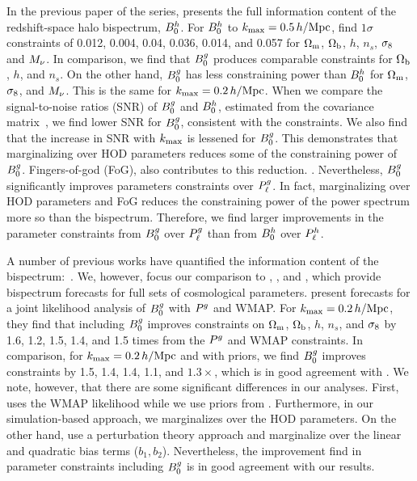 In the previous paper of the series, \cite{hahn2020} presents the full
information content of the redshift-space halo bispectrum, $B^h_0$. For $B^h_0$ to
$k_{\rm max}=0.5\,h/\mathrm{Mpc}$, \cite{hahn2020} find $1\sigma$ constraints of 0.012, 0.004,
0.04, 0.036, 0.014, and 0.057 for $\Omega_{\rm m}$, $\Omega_{\rm b}$, $h$, $n_s$, $\sigma_8$ and $M_\nu$. 
In comparison, we find that $B^g_0$ produces comparable constraints for $\Omega_{\rm b}$, 
$h$, and $n_s$. On the other hand, $B^g_0$ has less constraining power than 
$B^h_0$ for $\Omega_{\rm m}$, $\sigma_8$, and $M_\nu$. This is the same for $k_{\rm max}=0.2\,h/\mathrm{Mpc}$. 
When we compare the signal-to-noise ratios (SNR) of $B^g_0$ and $B^h_0$, estimated 
from the covariance matrix~\citep[\eg][]{sefusatti2005,sefusatti2006,chan2017}, 
we find lower SNR for $B^g_0$, consistent with the constraints. We also find that 
the increase in SNR with $k_{\rm max}$ is lessened for $B^g_0$. This demonstrates that 
marginalizing over HOD parameters reduces some of the constraining power of 
$B^g_0$.  Fingers-of-god (FoG), also contributes to this reduction. 
.
Nevertheless, $B^g_0$ significantly improves parameters constraints over $P^g_{\ell}$.
In fact, marginalizing over HOD parameters and FoG reduces the constraining
power of the power spectrum more so than the bispectrum. Therefore, we find 
larger improvements in the parameter constraints from $B^g_0$ over $P^g_{\ell}$ than
from $B^h_0$ over $P^h_{\ell}$.

A number of previous works have quantified the information content of the
bispectrum:~\citep[\eg][]{scoccimarro2004, sefusatti2006, sefusatti2007,
song2015, tellarini2016, yamauchi2017a, karagiannis2018, yankelevich2019,
chudaykin2019, coulton2019, reischke2019}. 
We, however, focus our comparison to \cite{sefusatti2006}, \cite{yankelevich2019}, 
and \cite{chudaykin2019}, which provide bispectrum forecasts for full sets of
cosmological parameters.
\cite{sefusatti2006} present \lcdm forecasts for a joint likelihood analysis of
$B^g_0$ with $P^g$ and WMAP. For $k_{\rm max} = 0.2\,h/\mathrm{Mpc}$, they find that including
$B^g_0$ improves constraints on $\Omega_{\rm m}$, $\Omega_{\rm b}$, $h$, $n_s$, and $\sigma_8$ by 1.6, 1.2,
1.5, 1.4, and 1.5 times from the $P^g$ and WMAP constraints. In comparison, for 
$k_{\rm max} = 0.2\,h/\mathrm{Mpc}$ and with \planck priors, we find $B^g_0$ improves constraints
by  1.5, 1.4, 1.4, 1.1, and $1.3\times$, which is in good agreement with
\cite{sefusatti2006}. We note, however, that there are
some significant differences in our analyses. First, \cite{sefusatti2006} uses 
the WMAP likelihood while we use priors from \planck. Furthermore, 
in our simulation-based approach, we marginalizes over the HOD parameters. On
the other hand, \cite{sefusatti2006} use a perturbation theory approach and 
marginalize over the linear and quadratic bias terms ($b_1, b_2$). 
Nevertheless, the improvement \cite{sefusatti2006} find in parameter constraints 
including $B^g_0$ is in good agreement with our results. 

